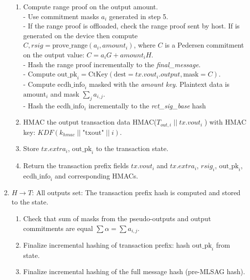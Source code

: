 \documentclass[]{article}
\begin{document}
\begin{enumerate}
\begin{enumerate}
        \item Compute range proof on the output amount. \\
        - Use commitment masks $a_i$ generated in step 5. \\
        - If the range proof is offloaded, check the range proof sent by host. If is generated on the device then compute $C, rsig = \text{prove\_range}(a_i, amount_i)$, where $C$ is a Pedersen commitment on the output value: $C = a_i G + amount_i H$. \\
        - Hash the range proof incrementally to the \emph{final\_message}.\\
        - Compute $\text{out\_pk}_i = \text{CtKey}(\text{dest}=tx.vout_i.output,\text{mask}=C)$.\\  
        - Compute $\text{ecdh\_info}_i$ masked with the \emph{amount key}. Plaintext data is $\text{amount}_i$ and mask $\sum_{j}a_{i, j}$. \\ \medskip
        - Hash the $\text{ecdh\_info}_i$ incrementally to the \emph{rct\_sig\_base} hash

        \item HMAC the output transaction data HMAC($T_{out,i} \; || \; tx.vout_i \; $) with HMAC key: $\textit{KDF}(k_{hmac} \; || \; \text{"txout"} \; || \; i)$.
                
        \item Store $tx.extra_i$, $\text{out\_pk}_i$ to the transaction state.
        
		\item Return the transaction prefix fields $tx.vout_i$ and $tx.extra_i$, $rsig_i$, $\text{out\_pk}_i$, $\text{ecdh\_info}_i$ and corresponding HMACs.
		
	\end{enumerate}
	  
	\item $H \rightarrow T$: All outputs set: The transaction prefix hash is computed and stored to the state. 
	
	\begin{enumerate}
		\item Check that sum of masks from the pseudo-outputs and output commitments are equal $\sum \alpha = \sum a_{i,j}$.
		
		\item Finalize incremental hashing of transaction prefix: hash $\text{out\_pk}_i$ from state. 
		
		\item Finalize incremental hashing of the full message hash (pre-MLSAG hash).
		

\end{enumerate}
\end{enumerate}
\end{document}
